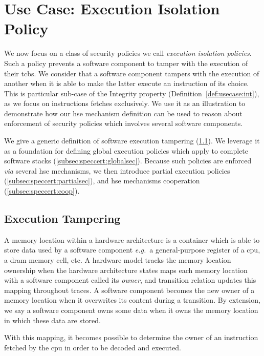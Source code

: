 \section{Use Case: Execution Isolation Policy}
\label{sec:speccert:usecase}

We now focus on a class of security policies we call \emph{execution isolation
  policies}.
%
Such a policy prevents a software component to tamper with the execution of
their \acp{tcb}.
%
We consider that a software component tampers with the execution of another when
it is able to make the latter execute an instruction of its choice.
%
This is particular sub-case of the Integrity property
(Definition~\ref{def:usecase:int}), as we focus on instructions fetches
exclusively.
%
We use it as an illustration to demonstrate how our \ac{hse} mechanism
definition can be used to reason about enforcement of security policies which
involves several software components.

We give a generic definition of software execution tampering
(\ref{subsec:speccert:tampering}).
%
We leverage it as a foundation for defining global execution policies which
apply to complete software stacks (\ref{subsec:speccert:globalsec}).
%
Because such policies are enforced \emph{via} several \ac{hse} mechanisms, we
then introduce partial execution policies (\ref{subsec:speccert:partialsec}),
and \ac{hse} mechanisms cooperation (\ref{subsec:speccert:coop}).

\subsection{Execution Tampering}
\label{subsec:speccert:tampering}
%
A memory location within a hardware architecture is a container which is able to
store data used by a software component \emph{e.g.}~a general-purpose register
of a \ac{cpu}, a \ac{dram} memory cell, etc.
%
A hardware model tracks the memory location ownership when the hardware
architecture states maps each memory location with a software component called
its \emph{owner}, and transition relation updates this mapping throughout
traces.
%
A software component becomes the new owner of a memory location when it
overwrites its content during a transition.
%
By extension, we say a software component owns some data when it owns the memory
location in which these data are stored.

With this mapping, it becomes possible to determine the owner of an instruction
fetched by the \ac{cpu} in order to be decoded and executed.


